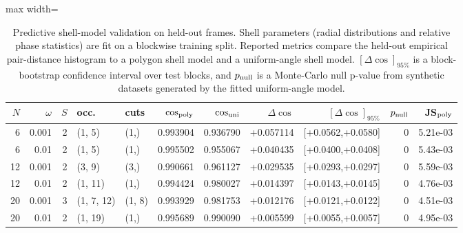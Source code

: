 \begin{table}[t]
\centering
\small
\setlength{\tabcolsep}{4.2pt}
\renewcommand{\arraystretch}{1.15}
\begin{adjustbox}{max width=\textwidth}
\begin{tabular}{rrrllrrrrrr}
\toprule
$N$ & $\omega$ & $S$ & occ. & cuts & $\cos_{\rm poly}$ & $\cos_{\rm uni}$ & $\Delta\cos$ & $[\Delta\cos]_{95\%}$ & $p_{\rm null}$ & JS$_{\rm poly}$ \\
\midrule
6 & 0.001 & 2 & (1, 5) & (1,) & 0.993904 & 0.936790 & +0.057114 & [+0.0562,+0.0580] & 0 & 5.21e-03 \\
6 & 0.01 & 2 & (1, 5) & (1,) & 0.995502 & 0.955067 & +0.040435 & [+0.0400,+0.0408] & 0 & 5.43e-03 \\
12 & 0.001 & 2 & (3, 9) & (3,) & 0.990661 & 0.961127 & +0.029535 & [+0.0293,+0.0297] & 0 & 5.59e-03 \\
12 & 0.01 & 2 & (1, 11) & (1,) & 0.994424 & 0.980027 & +0.014397 & [+0.0143,+0.0145] & 0 & 4.76e-03 \\
20 & 0.001 & 3 & (1, 7, 12) & (1, 8) & 0.993929 & 0.981753 & +0.012176 & [+0.0121,+0.0122] & 0 & 4.51e-03 \\
20 & 0.01 & 2 & (1, 19) & (1,) & 0.995689 & 0.990090 & +0.005599 & [+0.0055,+0.0057] & 0 & 4.95e-03 \\
\bottomrule
\end{tabular}
\end{adjustbox}
\caption{Predictive shell-model validation on held-out frames. Shell parameters (radial distributions and relative phase statistics) are fit on a blockwise training split. Reported metrics compare the held-out empirical pair-distance histogram to a polygon shell model and a uniform-angle shell model. $[\Delta\cos]_{95\%}$ is a block-bootstrap confidence interval over test blocks, and $p_{\rm null}$ is a Monte-Carlo null p-value from synthetic datasets generated by the fitted uniform-angle model.}
\label{tab:shell_model_validation_predictive}
\end{table}

